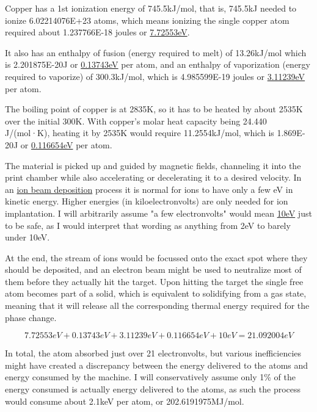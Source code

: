 \documentclass[a4paper]{article}
\begin{document}
	\medskip
	
	Copper has a 1st ionization energy of 745.5kJ/mol, that is, 745.5kJ needed to ionize 6.02214076E+23 atoms, which means ionizing the single copper atom required about 1.237766E-18 joules or \underline{7.72553eV}.
	
	It also has an enthalpy of fusion (energy required to melt) of 13.26kJ/mol which is 2.201875E-20J or \underline{0.13743eV} per atom, and an enthalpy of vaporization (energy required to vaporize) of 300.3kJ/mol, which is 4.985599E-19 joules or \underline{3.11239eV} per atom.
	
	\medskip
	
	The boiling point of copper is at 2835K, so it has to be heated by about 2535K over the initial 300K.
	With copper's molar heat capacity being 24.440 J/(mol·K), heating it by 2535K would require 11.2554kJ/mol, which is 1.869E-20J or \underline{0.116654eV} per atom.
	
	\medskip
	
	The material is picked up and guided by magnetic fields, channeling it into the print chamber while also accelerating or decelerating it to a desired velocity.
	In an \href{https://en.wikipedia.org/wiki/Ion_beam_deposition}{ion beam deposition} process it is normal for ions to have only a few eV in kinetic energy.
	Higher energies (in kiloelectronvolts) are only needed for ion implantation.
	I will arbitrarily assume "a few electronvolts" would mean \underline{10eV} just to be safe, as I would interpret that wording as anything from 2eV to barely under 10eV.
	
	\medskip
	
	At the end, the stream of ions would be focussed onto the exact spot where they should be deposited, and an electron beam might be used to neutralize most of them before they actually hit the target.
	Upon hitting the target the single free atom becomes part of a solid, which is equivalent to solidifying from a gas state, meaning that it will release all the corresponding thermal energy required for the phase change.
	
	\medskip
	
	$$ 7.72553eV + 0.13743eV + 3.11239eV + 0.116654eV + 10eV = 21.092004 eV $$
	
	\medskip
	
	In total, the atom absorbed just over 21 electronvolts, but various inefficiencies might have created a discrepancy between the energy delivered to the atoms and energy consumed by the machine.
	I will conservatively assume only 1\% of the energy consumed is actually energy delivered to the atoms, as such the process would consume about 2.1keV per atom, or 202.6191975MJ/mol.
	
\end{document}
